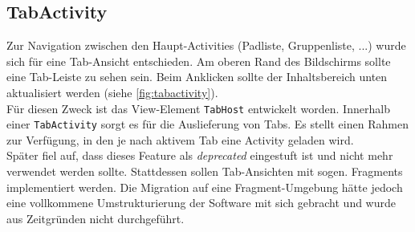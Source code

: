 \subsection{TabActivity}
Zur Navigation zwischen den Haupt-Activities (Padliste, Gruppenliste, ...) wurde sich für eine Tab-Ansicht entschieden.
Am oberen Rand des Bildschirms sollte eine Tab-Leiste zu sehen sein. 
Beim Anklicken sollte der Inhaltsbereich unten aktualisiert werden (siehe \autoref{fig:tabactivity}).\\
Für diesen Zweck ist das View-Element \texttt{TabHost} entwickelt worden.
Innerhalb einer \texttt{TabActivity} sorgt es für die Auslieferung von Tabs.
Es stellt einen Rahmen zur Verfügung, in den je nach aktivem Tab eine Activity geladen wird.\\
Später fiel auf, dass dieses Feature als \textit{deprecated} eingestuft ist und nicht mehr verwendet werden sollte.
Stattdessen sollen Tab-Ansichten mit sogen. Fragments implementiert werden.
Die Migration auf eine Fragment-Umgebung hätte jedoch eine vollkommene Umstrukturierung der Software mit sich gebracht und wurde aus Zeitgründen nicht durchgeführt.

